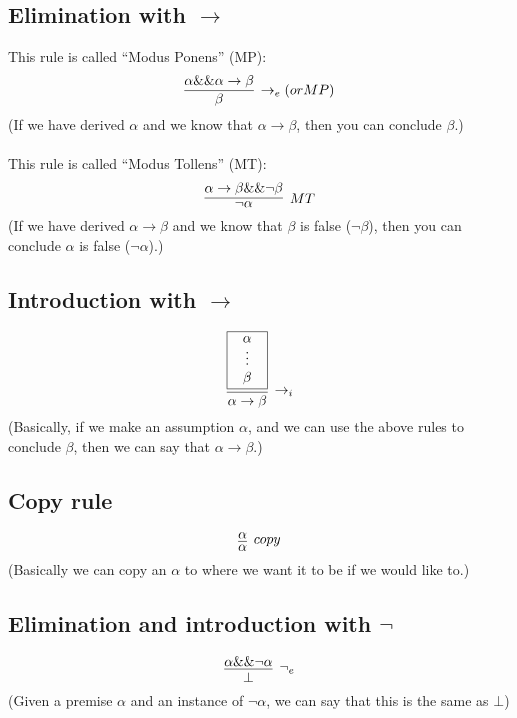 \documentclass{article}
\newcommand{\rulename}[1]{#1}
\begin{document}
\subsection{Elimination with $\to$}
    This rule is called ``Modus Ponens'' (MP):
    \begin{equation*}
      \infer[\rulename{\to_e} (or \rulename{MP})]
      {\beta}
      {\alpha \&\& \alpha \to \beta}
    \end{equation*}
    (If we have derived $\alpha$ and we know that $\alpha\to\beta$, then you can conclude $\beta$.)
    \\\\This rule is called ``Modus Tollens'' (MT):
    \begin{equation*}
      \infer[\rulename{MT}]
      {\neg\alpha}
      {\alpha \to \beta \&\& \neg\beta}
    \end{equation*}
    (If we have derived $\alpha \to \beta$ and we know that $\beta$ is false ($\neg\beta$), then you can conclude $\alpha$ is false ($\neg\alpha$).)
    
\subsection{Introduction with $\to$}
    \begin{equation*}
      \infer[\rulename{\to_i}]
      {\alpha \to \beta}
      {
        \framebox{\parbox{.8cm}{\centerline{$\alpha$}\centerline{$\vdots$}\centerline{$\beta$}}}
      }
    \end{equation*}
    (Basically, if we make an assumption $\alpha$, and we can use the above rules to conclude $\beta$, then we can say that $\alpha\to\beta$.)
    
\subsection{Copy rule}
    \begin{equation*}
      \infer[\rulename{copy}]
      {\alpha}
      {\alpha}
    \end{equation*}
    (Basically we can copy an $\alpha$ to where we want it to be if we would like to.)

\subsection{Elimination and introduction with $\neg$}
    \begin{equation*}
      \infer[\rulename{\neg_e}]
      {\bot}
      {\alpha \&\& \neg \alpha}
    \end{equation*}
    (Given a premise $\alpha$ and an instance of $\neg\alpha$, we can say that this is the same as $\bot$)
    
\end{document}
